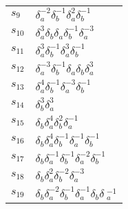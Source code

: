 \documentclass{article}
\begin{document}
\begin{center}
\begin{tabular}{ll}
$s_{9}$ & $\delta_a^{-2}\delta_b^{-1}\delta_a^{2}\delta_b^{-1}$ \\
$s_{10}$ & $\delta_a^{3}\delta_b^{}\delta_a^{}\delta_b^{-1}\delta_a^{-3}$ \\
$s_{11}$ & $\delta_a^{3}\delta_b^{-1}\delta_a^{3}\delta_b^{-1}$ \\
$s_{12}$ & $\delta_a^{-3}\delta_b^{-1}\delta_a^{}\delta_b^{}\delta_a^{3}$ \\
$s_{13}$ & $\delta_a^{4}\delta_b^{-1}\delta_a^{-3}\delta_b^{-1}$ \\
$s_{14}$ & $\delta_b^{3}\delta_a^{3}$ \\
$s_{15}$ & $\delta_b^{}\delta_a^{4}\delta_b^{2}\delta_a^{-1}$ \\
$s_{16}$ & $\delta_b^{}\delta_a^{4}\delta_b^{-1}\delta_a^{-1}\delta_b^{-1}$ \\
$s_{17}$ & $\delta_b^{}\delta_a^{-1}\delta_b^{-1}\delta_a^{-2}\delta_b^{-1}$ \\
$s_{18}$ & $\delta_b^{}\delta_a^{2}\delta_b^{-2}\delta_a^{-3}$ \\
$s_{19}$ & $\delta_b^{}\delta_a^{-2}\delta_b^{-1}\delta_a^{-1}\delta_b^{}\delta\
_a^{-1}$ \\
\bottomrule
\end{tabular}
\end{center}

\thispagestyle{empty}
\end{document}

